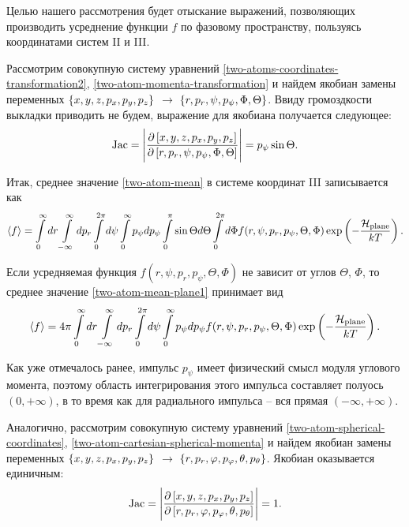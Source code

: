 Целью нашего рассмотрения будет отыскание выражений, позволяющих производить усреднение функции $f$ по фазовому пространству, пользуясь координатами систем II и III. \par
Рассмотрим совокупную систему уравнений \eqref{two-atoms-coordinates-transformation2}, \eqref{two-atom-momenta-transformation} и найдем якобиан замены переменных $\left\{ x, y, z, p_x, p_y, p_z \right\}$ $\rightarrow$ $\left\{ r, p_r, \psi, p_\psi, \Phi, \Theta \right\}$. Ввиду громоздкости выкладки приводить не будем, выражение для якобиана получается следующее:
\begin{gather}
    \text{Jac} = \Bigg\vert \frac{\partial \left[ x, y, z, p_x, p_y, p_z \right]}{\partial \left[ r, p_r, \psi, p_\psi, \Phi, \Theta \right]} \Bigg\vert = p_\psi \sin \Theta. \label{two-atom-planar-jacobian}
\end{gather}

Итак, среднее значение \eqref{two-atom-mean} в системе координат III записывается как
\begin{gather}
    \langle  f  \rangle = \int\limits_{0}^{\infty} dr \int\limits_{-\infty}^\infty dp_r \int\limits_0^{2\pi} d\psi \int\limits_0^\infty p_\psi dp_\psi \int\limits_0^\pi \sin \Theta d\Theta \int\limits_0^{2\pi} d\Phi f(r, \psi, p_r, p_\psi, \Theta, \Phi) \exp \left( -\frac{\mathcal{H}_\text{plane}}{k T} \right). \label{two-atom-mean-plane1} 
\end{gather}

Если усредняемая функция $f(r, \psi, p_r, p_\psi, \Theta, \Phi)$ не зависит от углов $\Theta$, $\Phi$, то среднее значение  \eqref{two-atom-mean-plane1} принимает вид 
\begin{gather}
    \langle  f  \rangle = 4 \pi \int\limits_{0}^{\infty} dr \int\limits_{-\infty}^\infty dp_r \int\limits_0^{2\pi} d\psi \int\limits_0^\infty p_\psi dp_\psi f(r, \psi, p_r, p_\psi, \Theta, \Phi) \exp \left( -\frac{\mathcal{H}_\text{plane}}{k T} \right). \label{two-atom-mean-plane2} 
\end{gather}

Как уже отмечалось ранее, импульс $p_\psi$ имеет физический смысл модуля углового момента, поэтому область интегрирования этого импульса составляет полуось $(0, +\infty)$, в то время как для радиального импульса -- вся прямая $(-\infty, +\infty)$. \par
Аналогично, рассмотрим совокупную систему уравнений \eqref{two-atom-spherical-coordinates}, \eqref{two-atom-cartesian-spherical-momenta} и найдем якобиан замены переменных $\left\{ x, y, z, p_x, p_y, p_z \right\}$ $\rightarrow$ $\left\{ r, p_r, \varphi, p_\varphi, \theta, p_\theta \right\}$. Якобиан оказывается единичным: 
\begin{gather}
    \text{Jac} = \Bigg\vert \frac{\partial \left[ x, y, z, p_x, p_y, p_z \right]}{\partial \left[ r, p_r, \varphi, p_\varphi, \theta, p_\theta \right]} \Bigg\vert = 1. 
\end{gather}

